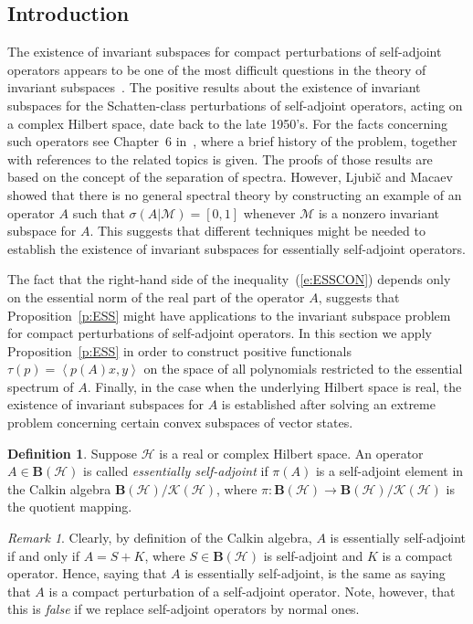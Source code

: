 \documentclass{tran-l}
\theoremstyle{definition}
\newtheorem{defn}[thm]{Definition}
\theoremstyle{remark}
\newtheorem{rem}[thm]{Remark}
\numberwithin{equation}{subsection}
\newcommand{\To}{\longrightarrow}
\newcommand{\h}{\mathcal{H}}
\newcommand{\M}{\mathcal{M}}
\newcommand{\BH}{\mathbf{B}(\mathcal{H})}
\newcommand{\KH}{\mathcal{K}(\mathcal{H})}
\newcommand{\seq}[1]{\left<#1\right>}
\begin{document}
\subsection{Introduction}
The existence of invariant subspaces for compact perturbations of self-adjoint operators appears to be one of the most difficult questions in the theory of invariant subspaces~\cite{Lom92}. The positive results about the existence of invariant subspaces for the Schatten-class perturbations of self-adjoint operators, acting on a complex Hilbert space, date back to the late 1950's. For the facts concerning such operators see Chapter~6 in~\cite{RR73}, where a brief history of the problem, together with references to the related topics is given. The proofs of those results are based on the concept of the separation of spectra. However, Ljubi\v{c} and Macaev~\cite{LM65} showed that there is no general spectral theory by constructing an example of an operator $A$ such that $\sigma(A|\M)=[0,1]$ whenever $\M$ is a nonzero invariant subspace for $A$. This suggests that different techniques might be needed to establish the existence of invariant subspaces for essentially self-adjoint operators.

The fact that the right-hand side of the inequality~(\ref{e:ESSCON}) depends only on the essential norm of the real part of the operator $A$, suggests that Proposition~\ref{p:ESS} might have applications to the invariant subspace problem for compact perturbations of self-adjoint operators. In this section we apply Proposition~\ref{p:ESS} in order to construct positive functionals $\tau(p)=\seq{p(A)x,y}$ on the space of all polynomials restricted to the essential spectrum of $A$. Finally, in the case when the underlying Hilbert space is real, the existence of invariant subspaces for $A$ is established after solving an extreme problem concerning certain convex subspaces of vector states.

\begin{defn}
Suppose $\h$ is a real or complex Hilbert space. An operator $A\in\BH$ is called \emph{essentially self-adjoint} if $\pi(A)$ is a self-adjoint element in the Calkin algebra $\BH/\KH$, where $\pi\colon\BH\To\BH/\KH$ is the quotient mapping.
\end{defn}

\begin{rem}
Clearly, by definition of the Calkin algebra, $A$ is essentially self-adjoint if and only if $A=S+K$, where $S\in\BH$ is self-adjoint and $K$ is a compact operator. Hence, saying that $A$ is essentially self-adjoint, is the same as saying that $A$ is a compact perturbation of a self-adjoint operator. Note, however, that this is \emph{false} if we replace self-adjoint operators by normal ones.
\end{rem}
\end{document}
